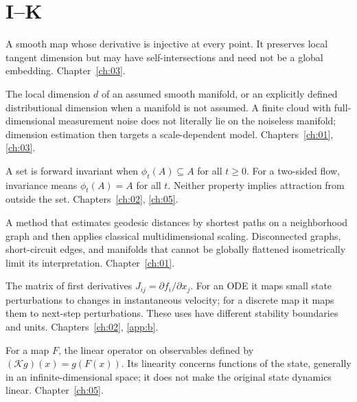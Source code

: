 \section*{I--K}
\begin{description}[style=nextline]
\item[Immersion.] A smooth map whose derivative is injective at every point. It preserves local tangent dimension but may have self-intersections and need not be a global embedding. Chapter~\ref{ch:03}.
\item[Intrinsic dimension.] The local dimension $d$ of an assumed smooth manifold, or an explicitly defined distributional dimension when a manifold is not assumed. A finite cloud with full-dimensional measurement noise does not literally lie on the noiseless manifold; dimension estimation then targets a scale-dependent model. Chapters~\ref{ch:01}, \ref{ch:03}.
\item[Invariant set.] A set is forward invariant when $\phi_t(A)\subseteq A$ for all $t\geq0$. For a two-sided flow, invariance means $\phi_t(A)=A$ for all $t$. Neither property implies attraction from outside the set. Chapters~\ref{ch:02}, \ref{ch:05}.
\item[Isomap.] A method that estimates geodesic distances by shortest paths on a neighborhood graph and then applies classical multidimensional scaling. Disconnected graphs, short-circuit edges, and manifolds that cannot be globally flattened isometrically limit its interpretation. Chapter~\ref{ch:01}.
\item[Jacobian.] The matrix of first derivatives $J_{ij}=\partial f_i/\partial x_j$. For an ODE it maps small state perturbations to changes in instantaneous velocity; for a discrete map it maps them to next-step perturbations. These uses have different stability boundaries and units. Chapters~\ref{ch:02}, \ref{app:b}.
\item[Koopman operator.] For a map $F$, the linear operator on observables defined by $(\mathcal K g)(x)=g(F(x))$. Its linearity concerns functions of the state, generally in an infinite-dimensional space; it does not make the original state dynamics linear. Chapter~\ref{ch:05}.
\end{description}

